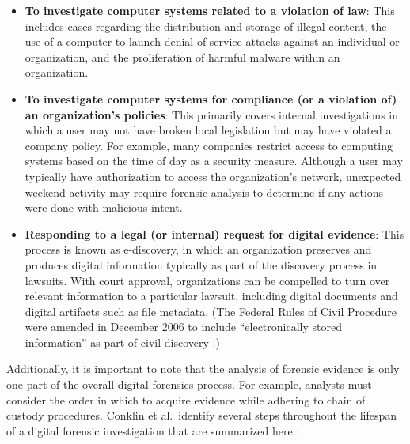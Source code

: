 \documentclass[letterpaper,12pt]{report}
\def\tightlist{}
\begin{document}
\begin{itemize}
\tightlist
\item
  \textbf{To investigate computer systems related to a violation of
  law}: This includes cases regarding the distribution and storage of
  illegal content, the use of a computer to launch denial of service
  attacks against an individual or organization, and the proliferation
  of harmful malware within an organization.
\item
  \textbf{To investigate computer systems for compliance (or a violation
  of) an organization's policies}: This primarily covers internal
  investigations in which a user may not have broken local legislation
  but may have violated a company policy. For example, many companies
  restrict access to computing systems based on the time of day as a
  security measure. Although a user may typically have authorization to
  access the organization's network, unexpected weekend activity may
  require forensic analysis to determine if any actions were done with
  malicious intent.
\item
  \textbf{Responding to a legal (or internal) request for digital
  evidence}: This process is known as e-discovery, in which an
  organization preserves and produces digital information typically as
  part of the discovery process in lawsuits. With court approval,
  organizations can be compelled to turn over relevant information to a
  particular lawsuit, including digital documents and digital artifacts
  such as file metadata. (The Federal Rules of Civil Procedure were
  amended in December 2006 to include ``electronically stored
  information'' as part of civil discovery
  \cite{withersj.ElectronicallyStoredInformation2006}.)
\end{itemize}

Additionally, it is important to note that the analysis of forensic
evidence is only one part of the overall digital forensics process. For
example, analysts must consider the order in which to acquire evidence
while adhering to chain of custody procedures. Conklin et al.~identify
several steps throughout the lifespan of a digital forensic
investigation that are summarized here
\cite{conklinComputerForensics2022}:
\end{document}
